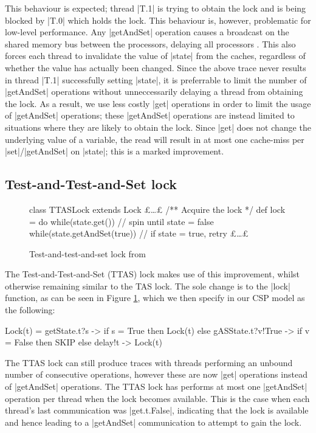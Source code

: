 This behaviour is expected; thread |T.1| is trying to obtain the lock and is being blocked by |T.0| which holds the lock. This behaviour is, however, problematic for low-level performance. Any |getAndSet| operation causes a broadcast on the shared memory bus between the processors, delaying all processors \cite{TAoMP}. This also forces each thread to invalidate the value of |state| from the caches, regardless of whether the value has actually been changed. Since the above trace never results in thread |T.1| successfully setting |state|, it is preferrable to limit the number of |getAndSet| operations without unneccessarily delaying a thread from obtaining the lock. As a result, we use less costly |get| operations in order to limit the usage of |getAndSet| operations; these |getAndSet| operations are instead limited to situations where they are likely to obtain the lock. Since |get| does not change the underlying value of a variable, the read will result in at most one cache-miss per |set|/|getAndSet| on |state|; this is a marked improvement.%


\subsection{Test-and-Test-and-Set lock}

\begin{figure}
  \begin{scala}
    class TTASLock extends Lock{ 
      £\dots£
      /** Acquire the lock */
      def lock = 
        do{
          while(state.get()){ } // spin until state = false
        } while(state.getAndSet(true)) // if state = true, retry
      £\dots£
    }
  \end{scala}
  \caption{Test-and-test-and-set lock from \cite{CADS}  \label{scala:TTAS}}
\end{figure}

The Test-and-Test-and-Set (TTAS) lock makes use of this improvement, whilst otherwise remaining similar to the TAS lock. The sole change is to the |lock| function, as can be seen in Figure \ref{scala:TTAS}, which we then specify in our CSP model as the following: 
\begin{cspm}
  Lock(t) =  getState.t?s -> if s = True then Lock(t)
                             else gASState.t?v!True -> if v = False then SKIP
                             else delay!t -> Lock(t)
\end{cspm}
The TTAS lock can still produce traces with threads performing an unbound number of consecutive operations, however these are now |get| operations instead of |getAndSet| operations. %
The TTAS lock has performs at most one |getAndSet| operation per thread when the lock becomes available. This is the case when each thread's last communication was |get.t.False|, indicating that the lock is available and hence leading to a |getAndSet| communication to attempt to gain the lock.


